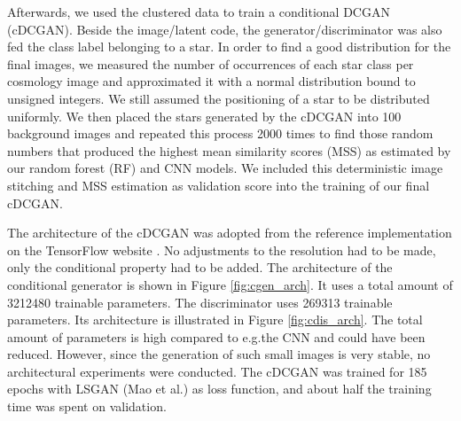 \documentclass[10pt,conference,compsocconf]{IEEEtran}
\begin{document}
Afterwards, we used the clustered data to train a conditional DCGAN (cDCGAN). Beside the image/latent code, the generator/discriminator was also fed the class label belonging to a star. In order to find a good distribution for the final images, we measured the number of occurrences of each star class per cosmology image and approximated it with a normal distribution bound to unsigned integers. We still assumed the positioning of a star to be distributed uniformly. We then placed the stars generated by the cDCGAN into \SI{100}{} background images and repeated this process \SI{2000}{} times to find those random numbers that produced the highest mean similarity scores (MSS) as estimated by our random forest (RF) and CNN models. We included this deterministic image stitching and MSS estimation as validation score into the training of our final cDCGAN.

The architecture of the cDCGAN was adopted from the reference implementation on the TensorFlow website \cite{dcgantf}. No adjustments to the resolution had to be made, only the conditional property had to be added. The architecture of the conditional generator is shown in Figure \ref{fig:cgen_arch}. It uses a total amount of \SI{3212480}{} trainable parameters. The discriminator uses \SI{269313}{} trainable parameters. Its architecture is illustrated in Figure \ref{fig:cdis_arch}. The total amount of parameters is high compared to e.g.\@ the CNN and could have been reduced. However, since the generation of such small images is very stable, no architectural experiments were conducted. The cDCGAN was trained for 185 epochs with LSGAN (Mao et al.\@ \cite{lsgan}) as loss function, and about half the training time was spent on validation.
\end{document}
